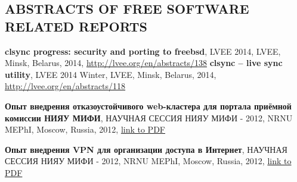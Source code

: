 \begin{resume}
\section{ABSTRACTS OF FREE SOFTWARE RELATED REPORTS}
\vspace{0.1in}
{\bf clsync progress: security and porting to freebsd}, LVEE 2014, LVEE, Minsk, Belarus, 2014, \href{http://lvee.org/en/abstracts/138}{http://lvee.org/en/abstracts/138}
{\bf clsync -- live sync utility}, LVEE 2014 Winter, LVEE, Minsk, Belarus, 2014, \href{http://lvee.org/en/abstracts/118}{http://lvee.org/en/abstracts/118}

{\bf Опыт внедрения отказоустойчивого web-кластера для портала приёмной комиссии НИЯУ МИФИ}, НАУЧНАЯ СЕССИЯ НИЯУ МИФИ - 2012, NRNU MEPhI, Moscow, Russia, 2012, \href{http://library.mephi.ru/data/scientific-sessions/2012/VK16.pdf}{link to PDF}

{\bf Опыт внедрения VPN для организации доступа в Интернет}, НАУЧНАЯ СЕССИЯ НИЯУ МИФИ - 2012, NRNU MEPhI, Moscow, Russia, 2012, \href{http://library.mephi.ru/data/scientific-sessions/2012/VK16.pdf}{link to PDF}

\end{resume}
